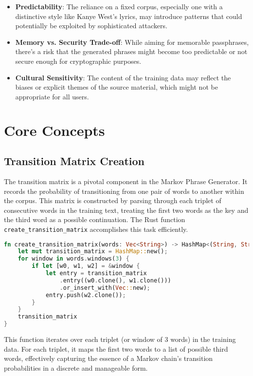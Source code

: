 \documentclass[a4paper,12pt]{article}
\begin{document}
\begin{itemize}
  \item \textbf{Predictability}: The reliance on a fixed corpus, especially one with a distinctive style like Kanye West's lyrics, may introduce patterns that could potentially be exploited by sophisticated attackers.
  \item \textbf{Memory vs. Security Trade-off}: While aiming for memorable passphrases, there's a risk that the generated phrases might become too predictable or not secure enough for cryptographic purposes.
  \item \textbf{Cultural Sensitivity}: The content of the training data may reflect the biases or explicit themes of the source material, which might not be appropriate for all users.
\end{itemize}

\section{Core Concepts}
\subsection{Transition Matrix Creation}
The transition matrix is a pivotal component in the Markov Phrase Generator. It records the probability of transitioning from one pair of words to another within the corpus. This matrix is constructed by parsing through each triplet of consecutive words in the training text, treating the first two words as the key and the third word as a possible continuation. The Rust function \texttt{create\_transition\_matrix} accomplishes this task efficiently.

\begin{lstlisting}[language=Rust, caption={Creating the Transition Matrix}]
fn create_transition_matrix(words: Vec<String>) -> HashMap<(String, String), Vec<String>> {
    let mut transition_matrix = HashMap::new();
    for window in words.windows(3) {
        if let [w0, w1, w2] = &window {
            let entry = transition_matrix
                .entry((w0.clone(), w1.clone()))
                .or_insert_with(Vec::new);
            entry.push(w2.clone());
        }
    }
    transition_matrix
}
\end{lstlisting}

This function iterates over each triplet (or window of 3 words) in the training data. For each triplet, it maps the first two words to a list of possible third words, effectively capturing the essence of a Markov chain's transition probabilities in a discrete and manageable form.
\end{document}
